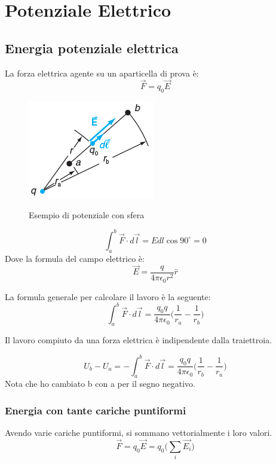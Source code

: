 \section{Potenziale Elettrico}
\subsection{Energia potenziale elettrica}

La forza elettrica agente su un aparticella di prova è:
\begin{equation*}
    \vec{F} = q_0\vec{E}
\end{equation*}

\begin{figure}[H]
    \centering
    \includegraphics[width=0.2\linewidth]{imgs/9 - potenziale.png}
    \label{fig:potenziale}
    \caption{Esempio di potenziale con sfera}
\end{figure}
\begin{equation}
    \int_a^b{\vec{F}\cdot d\vec{l}} = 
    Edl\cos{90^{\circ}} = 0
\end{equation}
Dove la formula del campo elettrico è:
\begin{equation*}
    \vec{E} = \frac{q}{4\pi\epsilon_0 r^2}\hat{r}
\end{equation*}

La formula generale per calcolare il lavoro è la seguente:
\begin{equation}
    \int_a^b{\vec{F}\cdot d\vec{l}} = 
    \frac{q_0q}{4\pi\epsilon_0}
    \Bigg(\frac{1}{r_a}-\frac{1}{r_b}\Bigg)
\end{equation}

Il lavoro compiuto da una forza elettrica è indipendente dalla traiettroia.

\begin{equation}
    U_b - U_a =
    - \int_a^b{\vec{F}\cdot d\vec{l}} =
    \frac{q_0q}{4\pi\epsilon_0}
    \Bigg(\frac{1}{r_b}-\frac{1}{r_a}\Bigg)
\end{equation}
Nota che ho cambiato b con a per il segno negativo.

\subsubsection{Energia con tante cariche puntiformi}
Avendo varie cariche puntiformi, si sommano vettorialmente i loro valori.
\begin{equation*}
    \vec{F} = q_0\vec{E} = q_0\Bigg(\sum_i{\vec{E_i}}\Bigg)
\end{equation*}

